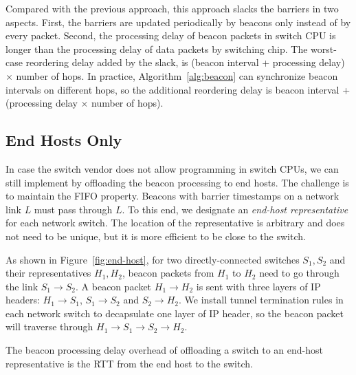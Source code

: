 Compared with the previous approach, this approach slacks the barriers in two aspects. First, the barriers are updated periodically by beacons only instead of by every packet. Second, the processing delay of beacon packets in switch CPU is longer than the processing delay of data packets by switching chip.
The worst-case reordering delay added by the slack, is (beacon interval + processing delay) $\times$ number of hops.
In practice, Algorithm~\ref{alg:beacon} can synchronize beacon intervals on different hops, so the additional reordering delay is beacon interval + (processing delay $\times$ number of hops).

\subsection{End Hosts Only}
\label{sec:end-host}

In case the switch vendor does not allow programming in switch CPUs, we can still implement \sys by offloading the beacon processing to end hosts. The challenge is to maintain the FIFO property. Beacons with barrier timestamps on a network link $L$ must pass through $L$. To this end, we designate an \textit{end-host representative} for each network switch. The location of the representative is arbitrary and does not need to be unique, but it is more efficient to be close to the switch.

As shown in Figure~\ref{fig:end-host}, for two directly-connected switches $S_1, S_2$ and their representatives $H_1, H_2$, beacon packets from $H_1$ to $H_2$ need to go through the link $S_1 \rightarrow S_2$. A beacon packet $H_1 \rightarrow H_2$ is sent with three layers of IP headers: $H_1 \rightarrow S_1$, $S_1 \rightarrow S_2$ and $S_2 \rightarrow H_2$. We install tunnel termination rules in each network switch to decapsulate one layer of IP header, so the beacon packet will traverse through $H_1 \rightarrow S_1 \rightarrow S_2 \rightarrow H_2$.

The beacon processing delay overhead of offloading a switch to an end-host representative is the RTT from the end host to the switch. %
